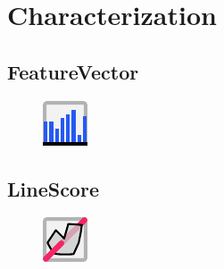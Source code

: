 \documentclass{ol-softwaremanual}
\begin{document}
\section{Characterization}
\subsection{FeatureVector}
\begin{figure}[h]
    \centering
    \includegraphics[width = .5\textwidth]{figures/Icons/FEATUREVEC.pdf}
\end{figure}

\subsection{LineScore}
\begin{figure}[h]
    \centering
    \includegraphics[width = .5\textwidth]{figures/Icons/LINESCORE.pdf}
\end{figure}
\end{document}
